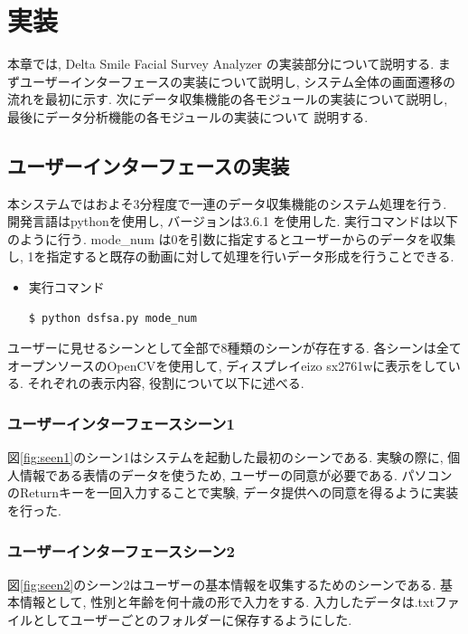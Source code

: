 \chapter{実装}
\label{chap:developing}
本章では, Delta Smile Facial Survey Analyzer の実装部分について説明する.
まずユーザーインターフェースの実装について説明し, システム全体の画面遷移の流れを最初に示す.
次にデータ収集機能の各モジュールの実装について説明し, 最後にデータ分析機能の各モジュールの実装について
説明する.

\section{ユーザーインターフェースの実装}
本システムではおよそ3分程度で一連のデータ収集機能のシステム処理を行う.
開発言語はpythonを使用し, バージョンは3.6.1 を使用した.
実行コマンドは以下のように行う. mode\_num は0を引数に指定するとユーザーからのデータを収集し,
1を指定すると既存の動画に対して処理を行いデータ形成を行うことできる.

\begin{itemize}
\item 実行コマンド
\begin{lstlisting}
$ python dsfsa.py mode_num
\end{lstlisting}
\end{itemize}

ユーザーに見せるシーンとして全部で8種類のシーンが存在する.
各シーンは全てオープンソースのOpenCVを使用して, ディスプレイeizo sx2761wに表示をしている.
それぞれの表示内容, 役割について以下に述べる.

\subsection{ユーザーインターフェースシーン1}
図\ref{fig:seen1}のシーン1はシステムを起動した最初のシーンである.
実験の際に, 個人情報である表情のデータを使うため, ユーザーの同意が必要である.
パソコンのReturnキーを一回入力することで実験, データ提供への同意を得るように実装を行った.

\subsection{ユーザーインターフェースシーン2}
図\ref{fig:seen2}のシーン2はユーザーの基本情報を収集するためのシーンである.
基本情報として, 性別と年齢を何十歳の形で入力をする.
入力したデータは.txtファイルとしてユーザーごとのフォルダーに保存するようにした.


